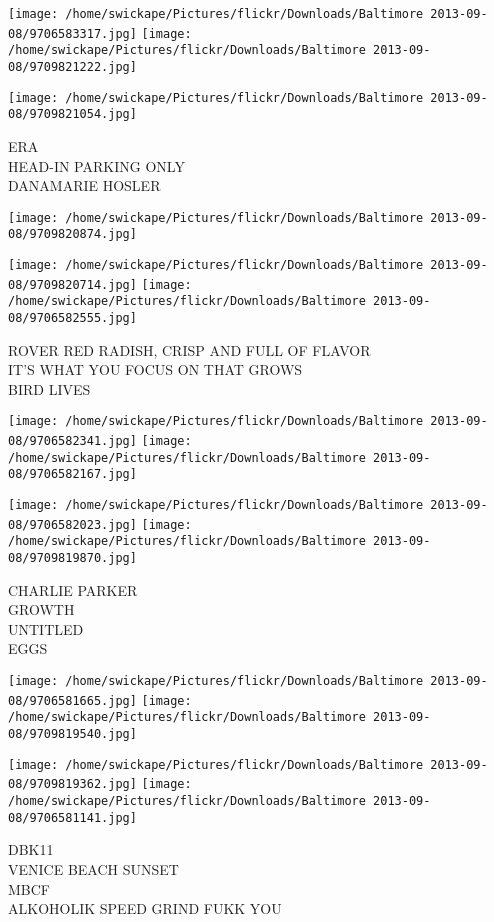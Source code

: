 \documentclass[10pt,letterpaper]{article}
\begin{document}
\texttt{[image: /home/swickape/Pictures/flickr/Downloads/Baltimore 2013-09-08/9706583317.jpg]}
\texttt{[image: /home/swickape/Pictures/flickr/Downloads/Baltimore 2013-09-08/9709821222.jpg]}

\texttt{[image: /home/swickape/Pictures/flickr/Downloads/Baltimore 2013-09-08/9709821054.jpg]}

ERA\\
HEAD{-}IN PARKING ONLY\\
DANAMARIE HOSLER
\pagebreak

\texttt{[image: /home/swickape/Pictures/flickr/Downloads/Baltimore 2013-09-08/9709820874.jpg]}

\vspace{0.25in}
\texttt{[image: /home/swickape/Pictures/flickr/Downloads/Baltimore 2013-09-08/9709820714.jpg]}
\texttt{[image: /home/swickape/Pictures/flickr/Downloads/Baltimore 2013-09-08/9706582555.jpg]}

ROVER RED RADISH, CRISP AND FULL OF FLAVOR\\
IT'S WHAT YOU FOCUS ON THAT GROWS\\
BIRD LIVES
\pagebreak

\texttt{[image: /home/swickape/Pictures/flickr/Downloads/Baltimore 2013-09-08/9706582341.jpg]}
\texttt{[image: /home/swickape/Pictures/flickr/Downloads/Baltimore 2013-09-08/9706582167.jpg]}

\texttt{[image: /home/swickape/Pictures/flickr/Downloads/Baltimore 2013-09-08/9706582023.jpg]}
\texttt{[image: /home/swickape/Pictures/flickr/Downloads/Baltimore 2013-09-08/9709819870.jpg]}

CHARLIE PARKER\\
GROWTH\\
UNTITLED\\
EGGS
\pagebreak

\texttt{[image: /home/swickape/Pictures/flickr/Downloads/Baltimore 2013-09-08/9706581665.jpg]}
\texttt{[image: /home/swickape/Pictures/flickr/Downloads/Baltimore 2013-09-08/9709819540.jpg]}

\texttt{[image: /home/swickape/Pictures/flickr/Downloads/Baltimore 2013-09-08/9709819362.jpg]}
\texttt{[image: /home/swickape/Pictures/flickr/Downloads/Baltimore 2013-09-08/9706581141.jpg]}

DBK11\\
VENICE BEACH SUNSET\\
MBCF\\
ALKOHOLIK SPEED GRIND FUKK YOU
\pagebreak
\end{document}
